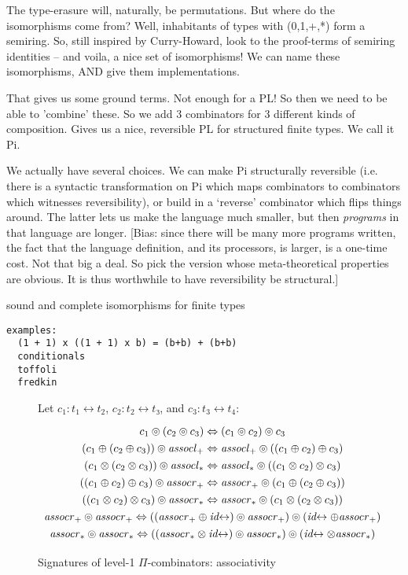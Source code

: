 \documentclass{article}
\newcommand{\assoclp}{\mathit{assocl}_+}
\newcommand{\assocrp}{\mathit{assocr}_+}
\newcommand{\assoclt}{\mathit{assocl}_*}
\newcommand{\assocrt}{\mathit{assocr}_*}
\newcommand{\idc}{\mathit{id}\!\!\leftrightarrow}
\begin{document}
The type-erasure will, naturally, be permutations. But where do the
isomorphisms come from?  Well, inhabitants of types with (0,1,+,*)
form a semiring. So, still inspired by Curry-Howard, look to the
proof-terms of semiring identities -- and voila, a nice set of
isomorphisms! We can name these isomorphisms, AND give them
implementations. 

That gives us some ground terms.  Not enough for a PL! So then
we need to be able to 'combine' these. So we add 3 combinators for
3 different kinds of composition.
Gives us a nice, reversible PL for
structured finite types. We call it Pi.

We actually have several choices. We can make Pi structurally reversible
(i.e. there is a syntactic transformation on Pi which maps combinators
to combinators which witnesses reversibility), or build in a `reverse'
combinator which flips things around. The latter lets us make the
language much smaller, but then \emph{programs} in that language are longer.
[Bias: since there will be many more programs written, the fact that the
language definition, and its processors, is larger, is a one-time cost.
Not that big a deal. So pick the version whose meta-theoretical
properties are obvious. It is thus worthwhile to have reversibility be
structural.]

sound and complete isomorphisms for finite types

\begin{verbatim}
examples: 
  (1 + 1) x ((1 + 1) x b) = (b+b) + (b+b)
  conditionals
  toffoli
  fredkin
\end{verbatim}

\begin{figure}[t]
Let $c_1 : t_1 \leftrightarrow t_2$,  $c_2 : t_2 \leftrightarrow t₃$, and $c_3 : t_3 \leftrightarrow t_4$:
\[\def\arraystretch{1.3}
\begin{array}{c}
  {c_1 \circledcirc (c_2 \circledcirc c_3) \Leftrightarrow (c_1 \circledcirc c_2) \circledcirc c_3}
\\
  {(c_1 \oplus (c_2 \oplus c_3)) \circledcirc \assoclp \Leftrightarrow \assoclp \circledcirc ((c_1 \oplus c_2) \oplus c_3)}
\\
  {(c_1 \otimes (c_2 \otimes c_3)) \circledcirc \assoclt \Leftrightarrow \assoclt \circledcirc ((c_1 \otimes c_2) \otimes c_3)}
\\
  {((c_1 \oplus c_2) \oplus c_3) \circledcirc \assocrp \Leftrightarrow \assocrp \circledcirc (c_1 \oplus (c_2 \oplus c_3))}
\\
  {((c_1 \otimes c_2) \otimes c_3) \circledcirc \assocrt \Leftrightarrow \assocrt \circledcirc (c_1 \otimes (c_2 \otimes c_3))}
\\
  {\assocrp \circledcirc \assocrp \Leftrightarrow ((\assocrp \oplus \idc) \circledcirc \assocrp) \circledcirc (\idc \oplus \assocrp)}
\\
  {\assocrt \circledcirc \assocrt \Leftrightarrow ((\assocrt \otimes \idc) \circledcirc \assocrt) \circledcirc (\idc \otimes \assocrt)}
\end{array}\]
\caption{\label{figj}Signatures of level-1 $\Pi$-combinators: associativity}
\end{figure}
  
\end{document}
